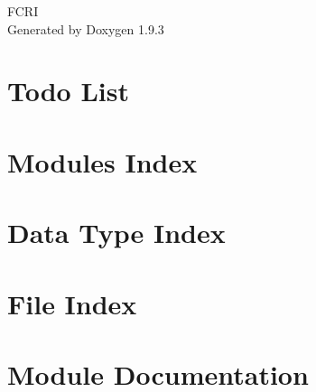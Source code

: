 \documentclass[twoside]{book}
\newcommand{\+}{\discretionary{\mbox{\scriptsize$\hookleftarrow$}}{}{}}
\newcommand{\clearemptydoublepage}{%
    \newpage{\pagestyle{empty}\cleardoublepage}%
  }
\begin{document}
  \raggedbottom
    \hypersetup{pageanchor=false,
                bookmarksnumbered=true,
                pdfencoding=unicode
               }
  \begin{titlepage}
  \vspace*{7cm}
  \begin{center}%
  {\Large FCRI}\\
  \vspace*{1cm}
  {\large Generated by Doxygen 1.9.3}\\
  \end{center}
  \end{titlepage}
  \clearemptydoublepage
  \tableofcontents
  \clearemptydoublepage
  \hypersetup{pageanchor=true}
\chapter{Todo List}
\label{todo}

\chapter{Modules Index}

\chapter{Data Type Index}

\chapter{File Index}

\chapter{Module Documentation}













\end{document}
